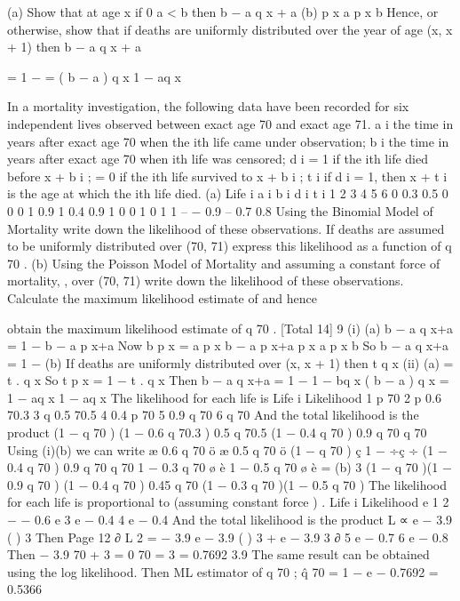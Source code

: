 \documentclass[a4paper,1pt]{article}
\begin{document}
\item 
(a)
Show that at age x if 0 \leq  a < b  then
b − a q x + a
(b)
p x
a p x
b
Hence, or otherwise, show that if deaths are uniformly distributed
over the year of age (x, x + 1) then
b − a q x + a
\item 
= 1 −
=
( b − a ) q x
1 − aq x

In a mortality investigation, the following data have been recorded for six
independent lives observed between exact age 70 and exact age 71.
a i the time in years after exact age 70 when the ith life came under
observation;
b i the time in years after exact age 70 when ith life was censored;
d i = 1 if the ith life died before x + b i ;
= 0 if the ith life survived to x + b i ;
t i if d i = 1, then x + t i is the age at which the ith life died.
(a)
Life i a i b i d i t i
1
2
3
4
5
6 0
0.3
0.5
0
0
0 1
0.9
1
0.4
0.9
1 0
0
1
0
1
1 –
−
0.9
–
0.7
0.8
Using the Binomial Model of Mortality write down the likelihood of
these observations.
If deaths are assumed to be uniformly distributed over (70, 71)
express this likelihood as a function of q 70 .
(b)
Using the Poisson Model of Mortality and assuming a constant
force of mortality,  , over (70, 71) write down the likelihood of
these observations.
Calculate the maximum likelihood estimate of  and hence

obtain the maximum likelihood estimate of q 70 .
[Total 14]
9
(i)
(a)
b − a q x+a
= 1 − b − a p x+a
Now b p x = a p x b − a p x+a
p x
a p x
b
So b − a q x+a = 1 −
(b)
If deaths are uniformly distributed over (x, x + 1) then
t q x
(ii)
(a)
= t . q x
So t
p x = 1 − t . q x
Then b − a q x+a
= 1 −
1 − bq x
( b − a ) q x
=
1 − aq x
1 − aq x
The likelihood for each life is
Life i
Likelihood
1
p 70
2
p
0.6 70.3
3
q
0.5 70.5
4
0.4 p 70
5
0.9 q 70
6
q 70
And the total likelihood is the product
(1 − q 70 ) (1 − 0.6 q 70.3 ) 0.5 q 70.5 (1 − 0.4 q 70 ) 0.9 q 70 q 70
Using (i)(b) we can write
æ
0.6 q 70 ö æ 0.5 q 70 ö
(1 − q 70 ) ç 1 −
÷ç
÷ (1 − 0.4 q 70 ) 0.9 q 70 q 70
1 − 0.3 q 70 ø è 1 − 0.5 q 70 ø
è
=
(b)
3
(1 − q 70 )(1 − 0.9 q 70 ) (1 − 0.4 q 70 ) 0.45 q 70
(1 − 0.3 q 70 )(1 − 0.5 q 70 )
The likelihood for each life is proportional to (assuming constant
force  ) .
Life i
Likelihood
e
1 2
− − 0.6 
e
3
e
− 0.4 
4
e
− 0.4 
And the total likelihood is the product
L ∝ e − 3.9  (  ) 3
Then
Page 12
∂ L
2
= − 3.9 e − 3.9  (  ) 3 + e − 3.9  3 
∂
5
e
− 0.7 
6
e
− 0.8 
Then − 3.9 \hat{\mu} 70 + 3 = 0
\hat{\mu} 70 =
3
= 0.7692
3.9
The same result can be obtained using the log likelihood.
Then ML estimator of q 70 ; q̂ 70 = 1 − e − 0.7692 = 0.5366
\end{document}
